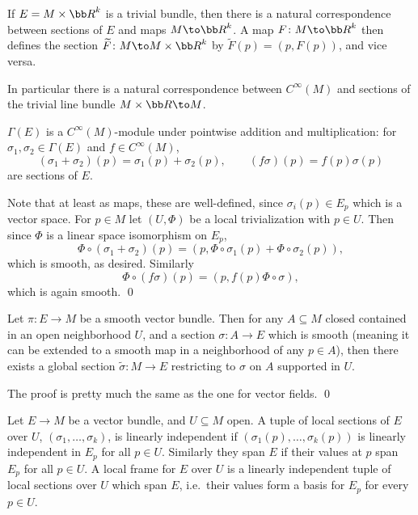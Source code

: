     If $E=M\times\bR^k$ is a trivial bundle, then there is a natural correspondence between sections of $E$ and maps $M\to\bR^k$.
    A map $F\colon M\to\bR^k$ then defines the section $\tilde F\colon M\to M\times\bR^k$ by $\tilde F(p)=(p,F(p))$, and vice versa.

    In particular there is a natural correspondence between $C^\infty(M)$ and sections of the trivial line bundle $M\times\bR\to M$.

\eexam

\bprop

    $\Gamma(E)$ is a $C^\infty(M)$-module under pointwise addition and multiplication: for $\sigma_1,\sigma_2\in\Gamma(E)$ and $f\in C^\infty(M)$,
    $$ (\sigma_1+\sigma_2)(p) = \sigma_1(p) + \sigma_2(p),\qquad (f\sigma)(p) = f(p)\sigma(p) $$
    are sections of $E$.

\eprop

\bproof

    Note that at least as maps, these are well-defined, since $\sigma_i(p)\in E_p$ which is a vector space.
    For $p\in M$ let $(U,\Phi)$ be a local trivialization with $p\in U$.
    Then since $\Phi$ is a linear space isomorphism on $E_p$,
    $$ \Phi\circ(\sigma_1+\sigma_2)(p) = (p,\Phi\circ\sigma_1(p)+\Phi\circ\sigma_2(p)) , $$
    which is smooth, as desired.
    Similarly
    $$ \Phi\circ(f\sigma)(p) = (p,f(p)\Phi\circ\sigma) , $$
    which is again smooth.
    \qed

\eproof

\blemm

    Let $\pi\colon E\to M$ be a smooth vector bundle.
    Then for any $A\subseteq M$ closed contained in an open neighborhood $U$, and a section $\sigma\colon A\to E$ which is smooth (meaning it can be
    extended to a smooth map in a neighborhood of any $p\in A$), then there exists a global section $\tilde\sigma\colon M\to E$ restricting to $\sigma$
    on $A$ supported in $U$.

\elemm

\bproof

    The proof is pretty much the same as the one for vector fields.
    \qed

\eproof

\bdefn

    Let $E\to M$ be a vector bundle, and $U\subseteq M$ open.
    A tuple of local sections of $E$ over $U$, $(\sigma_1,\dots,\sigma_k)$, is {\emphcolor linearly independent} if $(\sigma_1(p),\dots,\sigma_k(p))$ is
    linearly independent in $E_p$ for all $p\in U$.
    Similarly they {\emphcolor span $E$} if their values at $p$ span $E_p$ for all $p\in U$.
    A {\emphcolor local frame} for $E$ over $U$ is a linearly independent tuple of local sections over $U$ which span $E$, i.e.\ their values form a basis
    for $E_p$ for every $p\in U$.

